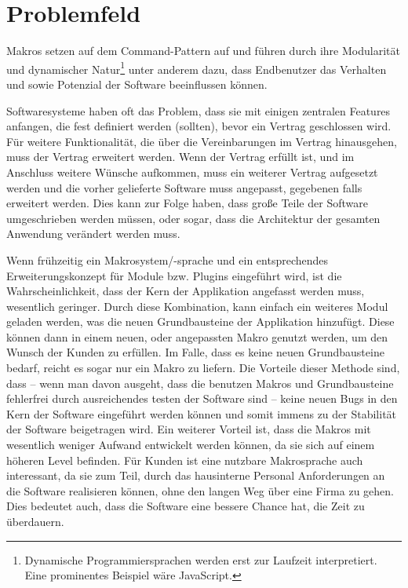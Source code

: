 \section{Problemfeld}
\label{sec:problemfeld}
  Makros setzen auf dem Command-Pattern\autocite[S.263]{Gamma:1995:DPE:186897} auf und führen durch ihre Modularität und dynamischer Natur\footnote{%
    Dynamische Programmiersprachen werden erst zur Laufzeit interpretiert. Eine prominentes Beispiel wäre JavaScript.
  } unter anderem dazu, dass Endbenutzer das Verhalten und sowie Potenzial der Software beeinflussen können.

  Softwaresysteme haben oft das Problem, dass sie mit einigen zentralen Features anfangen, die fest definiert werden (sollten), bevor ein Vertrag geschlossen wird. Für weitere Funktionalität, die über die Vereinbarungen im Vertrag hinausgehen, muss der Vertrag erweitert werden. Wenn der Vertrag erfüllt ist, und im Anschluss weitere Wünsche aufkommen, muss ein weiterer Vertrag aufgesetzt werden und die vorher gelieferte Software muss angepasst, gegebenen falls erweitert werden. Dies kann zur Folge haben, dass große Teile der Software umgeschrieben werden müssen, oder sogar, dass die Architektur der gesamten Anwendung verändert werden muss.

  Wenn frühzeitig ein Makrosystem/-sprache und ein entsprechendes Erweiterungskonzept für Module bzw. Plugins eingeführt wird, ist die Wahrscheinlichkeit, dass der Kern der Applikation angefasst werden muss, wesentlich geringer. Durch diese Kombination, kann einfach ein weiteres Modul geladen werden, was die neuen Grundbausteine der Applikation hinzufügt. Diese können dann in einem neuen, oder angepassten Makro genutzt werden, um den Wunsch der Kunden zu erfüllen. Im Falle, dass es keine neuen Grundbausteine bedarf, reicht es sogar nur ein Makro zu liefern. Die Vorteile dieser Methode sind, dass -- wenn man davon ausgeht, dass die benutzen Makros und Grundbausteine fehlerfrei durch ausreichendes testen der Software sind -- keine neuen Bugs in den Kern der Software eingeführt werden können und somit immens zu der Stabilität der Software beigetragen wird. Ein weiterer Vorteil ist, dass die Makros mit wesentlich weniger Aufwand entwickelt werden können, da sie sich auf einem höheren Level befinden. Für Kunden ist eine nutzbare Makrosprache auch interessant, da sie zum Teil, durch das hausinterne Personal Anforderungen an die Software realisieren können, ohne den langen Weg über eine Firma zu gehen. Dies bedeutet auch, dass die Software eine bessere Chance hat, die Zeit zu überdauern.

